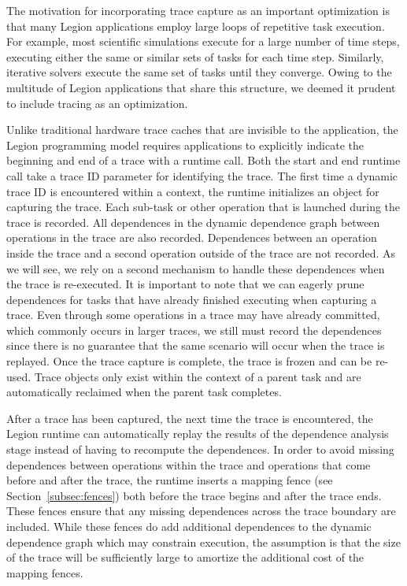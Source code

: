 The motivation for incorporating trace capture
as an important optimization is that many 
Legion applications employ 
large loops of repetitive task execution. For
example, most scientific simulations execute
for a large number of time steps, executing
either the same or similar sets of tasks
for each time step. Similarly, iterative
solvers execute the same set of tasks until
they converge. Owing to the multitude of 
Legion applications that share this structure,
we deemed it prudent to include tracing as
an optimization.

Unlike traditional hardware trace caches that 
are invisible to the application, the Legion
programming model requires applications to 
explicitly indicate the beginning and end of
a trace with a runtime call. Both the start
and end runtime call
take a trace ID parameter for identifying
the trace. The first time a dynamic trace ID
is encountered within a context, the runtime 
initializes an object for capturing the trace. 
Each sub-task or other operation that is 
launched during the trace is recorded. All 
dependences in the dynamic dependence graph 
between operations in the trace are also 
recorded. Dependences between an operation 
inside the trace and a second 
operation outside of the trace are not 
recorded. As we will see, we rely on a second 
mechanism to handle these dependences when 
the trace is re-executed. It is important to 
note that we can eagerly prune dependences
for tasks that have already finished executing
when capturing a trace. Even through some operations
in a trace may have already committed, which
commonly occurs in larger traces, we still must
record the dependences since there is no
guarantee that the same scenario will occur
when the trace is replayed. Once the trace 
capture is complete, the trace is frozen and 
can be re-used. Trace objects only exist within
the context of a parent task and are automatically 
reclaimed when the parent task completes.

After a trace has been captured, the next
time the trace is encountered, the Legion
runtime can automatically replay the results
of the dependence analysis stage instead
of having to recompute the dependences.
In order to avoid missing dependences between
operations within the trace and operations
that come before and after the trace, the
runtime inserts a mapping fence (see 
Section~\ref{subsec:fences}) both before 
the trace begins and after the trace ends.
These fences ensure that any missing 
dependences across the trace boundary are
included.  While these fences do add additional
dependences to the dynamic dependence graph
which may constrain execution, the assumption
is that the size of the trace will be 
sufficiently large to amortize the additional
cost of the mapping fences.

